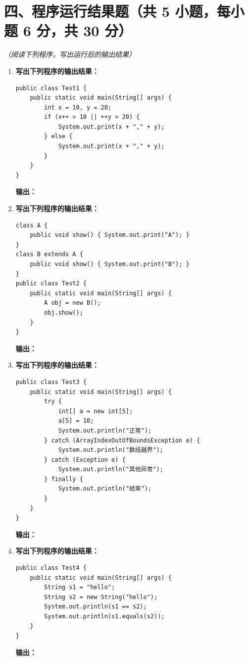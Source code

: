 \documentclass[a3paper, landscape, 11pt, twocolumn]{article}
\begin{document}
\vspace{0.5cm}

\section*{四、程序运行结果题（共 5 小题，每小题 6 分，共 30 分）}
\textit{（阅读下列程序，写出运行后的输出结果）}

\begin{enumerate}[leftmargin=*, label=\arabic*., itemsep=1em]
	\item \textbf{写出下列程序的输出结果：}
	      \begin{lstlisting}[style=JavaExam]
public class Test1 {
    public static void main(String[] args) {
        int x = 10, y = 20;
        if (x++ > 10 || ++y > 20) {
            System.out.print(x + "," + y);
        } else {
            System.out.print(x + "," + y);
        }
    }
}
\end{lstlisting}
	      \textbf{输出：}\underline{\hspace{6cm}}

	\item \textbf{写出下列程序的输出结果：}
	      \begin{lstlisting}[style=JavaExam]
class A {
    public void show() { System.out.print("A"); }
}
class B extends A {
    public void show() { System.out.print("B"); }
}
public class Test2 {
    public static void main(String[] args) {
        A obj = new B();
        obj.show();
    }
}
\end{lstlisting}
	      \textbf{输出：}\underline{\hspace{6cm}}

	\item \textbf{写出下列程序的输出结果：}
	      \begin{lstlisting}[style=JavaExam]
public class Test3 {
    public static void main(String[] args) {
        try {
            int[] a = new int[5];
            a[5] = 10;
            System.out.println("正常");
        } catch (ArrayIndexOutOfBoundsException e) {
            System.out.println("数组越界");
        } catch (Exception e) {
            System.out.println("其他异常");
        } finally {
            System.out.println("结束");
        }
    }
}
\end{lstlisting}
	      \textbf{输出：}\underline{\hspace{6cm}}

	\item \textbf{写出下列程序的输出结果：}
	      \begin{lstlisting}[style=JavaExam]
public class Test4 {
    public static void main(String[] args) {
        String s1 = "hello";
        String s2 = new String("hello");
        System.out.println(s1 == s2);
        System.out.println(s1.equals(s2));
    }
}
\end{lstlisting}
	      \textbf{输出：}\underline{\hspace{6cm}}


\end{enumerate}
\end{document}

